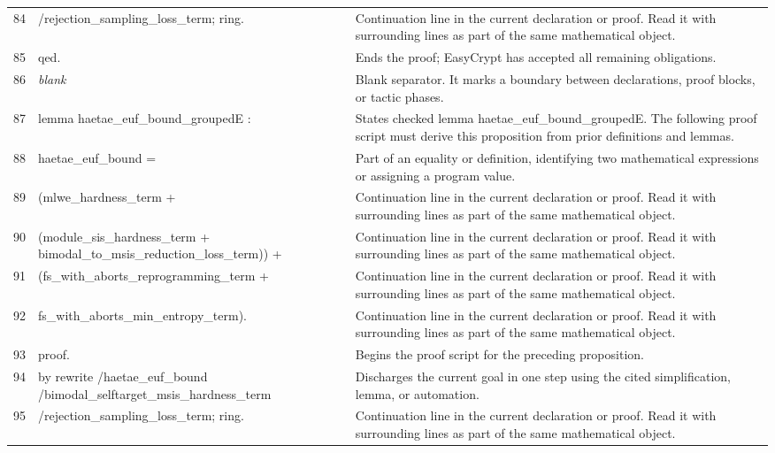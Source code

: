 \documentclass[10pt]{article}
\begin{document}
\begin{longtable}{r L{0.53\textwidth} L{0.37\textwidth}}
84 & {\ttfamily\scriptsize            /rejection\_sampling\_loss\_term; ring.} & Continuation line in the current declaration or proof.  Read it with surrounding lines as part of the same mathematical object. \\
85 & {\ttfamily\scriptsize qed.} & Ends the proof; EasyCrypt has accepted all remaining obligations. \\
86 & {\ttfamily\scriptsize \emph{blank}} & Blank separator.  It marks a boundary between declarations, proof blocks, or tactic phases. \\
87 & {\ttfamily\scriptsize lemma haetae\_euf\_bound\_groupedE :} & States checked lemma haetae\_euf\_bound\_groupedE.  The following proof script must derive this proposition from prior definitions and lemmas. \\
88 & {\ttfamily\scriptsize   haetae\_euf\_bound =} & Part of an equality or definition, identifying two mathematical expressions or assigning a program value. \\
89 & {\ttfamily\scriptsize     (mlwe\_hardness\_term +} & Continuation line in the current declaration or proof.  Read it with surrounding lines as part of the same mathematical object. \\
90 & {\ttfamily\scriptsize       (module\_sis\_hardness\_term + bimodal\_to\_msis\_reduction\_loss\_term)) +} & Continuation line in the current declaration or proof.  Read it with surrounding lines as part of the same mathematical object. \\
91 & {\ttfamily\scriptsize     (fs\_with\_aborts\_reprogramming\_term +} & Continuation line in the current declaration or proof.  Read it with surrounding lines as part of the same mathematical object. \\
92 & {\ttfamily\scriptsize       fs\_with\_aborts\_min\_entropy\_term).} & Continuation line in the current declaration or proof.  Read it with surrounding lines as part of the same mathematical object. \\
93 & {\ttfamily\scriptsize proof.} & Begins the proof script for the preceding proposition. \\
94 & {\ttfamily\scriptsize by rewrite /haetae\_euf\_bound /bimodal\_selftarget\_msis\_hardness\_term} & Discharges the current goal in one step using the cited simplification, lemma, or automation. \\
95 & {\ttfamily\scriptsize            /rejection\_sampling\_loss\_term; ring.} & Continuation line in the current declaration or proof.  Read it with surrounding lines as part of the same mathematical object. \\

\end{longtable}
\end{document}
